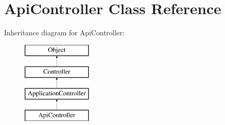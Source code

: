 \hypertarget{class_api_controller}{
\section{ApiController Class Reference}
\label{class_api_controller}
}
Inheritance diagram for ApiController:\begin{figure}[H]
\begin{center}
\leavevmode
\includegraphics[height=4.000000cm]{class_api_controller}
\end{center}
\end{figure}
